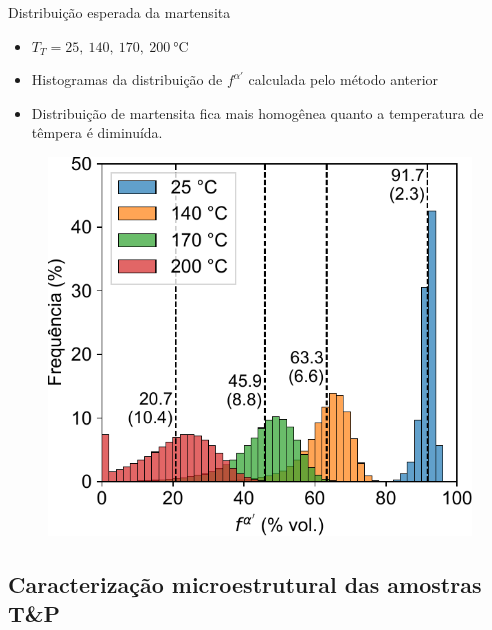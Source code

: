 \begin{frame}{Distribuição esperada da martensita}
  \begin{itemize}
    \item $T_T = 25,\ 140,\ 170,\ \SI{200}{\degreeCelsius}$
    \item Histogramas da distribuição de $f^{\alpha'}$ calculada pelo método anterior
    \item Distribuição de martensita fica mais homogênea quanto a temperatura de têmpera é diminuída.
  \end{itemize}

  \begin{figure}
    \includegraphics[width=.7\textwidth]{img/fmart_different_TQ.pdf}\hfill
  \end{figure}
\end{frame}


\subsection{Caracterização microestrutural das amostras T\&P}

  


